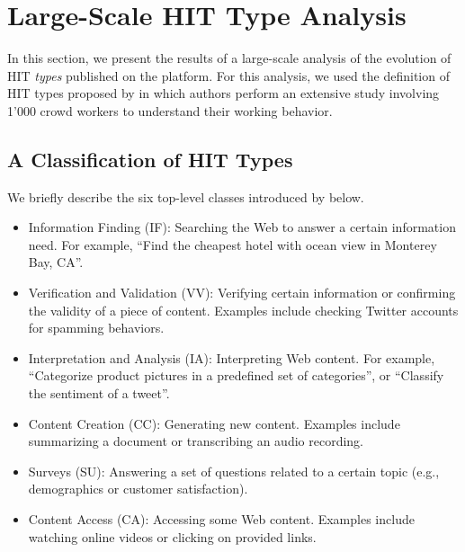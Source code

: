 \section{Large-Scale HIT Type Analysis}\label{sec:type}
In this section, we present the results of a large-scale analysis of the evolution of HIT \emph{types} published on the \amt{} platform.
For this analysis, we used the definition of HIT types proposed by \cite{Gadiraju:2014:TMW:2631775.2631819} in which authors perform an extensive study involving 1'000 crowd workers to understand their working behavior. 

\subsection{A Classification of HIT Types}
We briefly describe the six top-level classes introduced by \cite{Gadiraju:2014:TMW:2631775.2631819} below.

\begin{itemize}[noitemsep,topsep=0pt,parsep=0pt,partopsep=0pt]

	\item Information Finding (IF): Searching the Web to answer a certain information need. For example, ``Find the cheapest hotel with ocean view in Monterey Bay, CA''.
	
	\item Verification and Validation (VV): Verifying certain information or confirming the validity of a piece of content. Examples include checking Twitter accounts for spamming behaviors.

	\item Interpretation and Analysis (IA): Interpreting Web content. For example, ``Categorize product pictures in a predefined set of categories'', or ``Classify the sentiment of a tweet''.
	
	\item Content Creation (CC): Generating new content. Examples include summarizing a document  or transcribing an audio recording.

	\item Surveys (SU): Answering a set of questions related to a certain topic (e.g., demographics or customer satisfaction). 
	
	\item Content Access (CA): Accessing some Web content. Examples include watching online videos or clicking on provided links.

\end{itemize}

